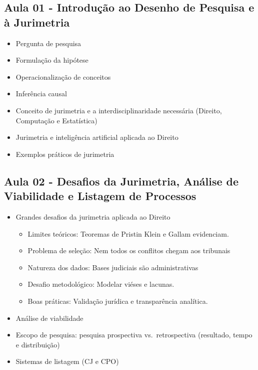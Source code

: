 \documentclass[
  letterpaper,
  DIV=11,
  numbers=noendperiod]{scrreprt}
\providecommand{\tightlist}{%
  \setlength{\itemsep}{0pt}\setlength{\parskip}{0pt}}
\begin{document}
\subsection{Aula 01 - Introdução ao Desenho de Pesquisa e à
Jurimetria}\label{aula-01---introduuxe7uxe3o-ao-desenho-de-pesquisa-e-uxe0-jurimetria}

\begin{itemize}
\tightlist
\item
  Pergunta de pesquisa\\
\item
  Formulação da hipótese\\
\item
  Operacionalização de conceitos\\
\item
  Inferência causal\\
\item
  Conceito de jurimetria e a interdisciplinaridade necessária (Direito,
  Computação e Estatística)\\
\item
  Jurimetria e inteligência artificial aplicada ao Direito\\
\item
  Exemplos práticos de jurimetria
\end{itemize}

\subsection{Aula 02 - Desafios da Jurimetria, Análise de Viabilidade e
Listagem de
Processos}\label{aula-02---desafios-da-jurimetria-anuxe1lise-de-viabilidade-e-listagem-de-processos}

\begin{itemize}
\tightlist
\item
  Grandes desafios da jurimetria aplicada ao Direito

  \begin{itemize}
  \tightlist
  \item
    Limites teóricos: Teoremas de Pristin Klein e Gallam evidenciam.
  \item
    Problema de seleção: Nem todos os conflitos chegam aos tribunais
  \item
    Natureza dos dados: Bases judiciais são administrativas
  \item
    Desafio metodológico: Modelar viéses e lacunas.
  \item
    Boas práticas: Validação jurídica e transparência analítica.
  \end{itemize}
\item
  Análise de viabilidade\\
\item
  Escopo de pesquisa: pesquisa prospectiva vs.~retrospectiva (resultado,
  tempo e distribuição)\\
\item
  Sistemas de listagem (CJ e CPO)
\end{itemize}
\end{document}
